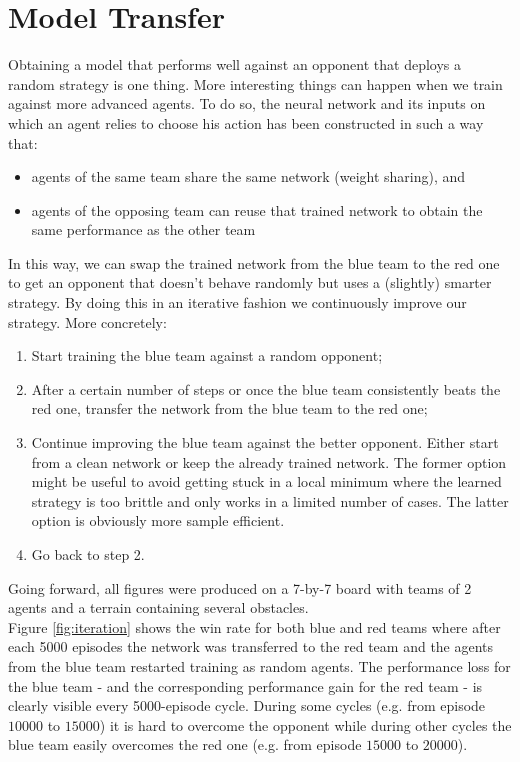 \section{Model Transfer}
\label{sec:model_transfer}
Obtaining a model that performs well against an opponent that deploys a random strategy is one thing. More interesting things can happen when we train against more advanced agents. To do so, the neural network and its inputs on which an agent relies to choose his action has been constructed in such a way that:
\begin{itemize}
    \item agents of the same team share the same network (weight sharing), and
    \item agents of the opposing team can reuse that trained network to obtain the same performance as the other team
\end{itemize}
In this way, we can swap the trained network from the blue team to the red one to get an opponent that doesn't behave randomly but uses a (slightly) smarter strategy. By doing this in an iterative fashion we continuously improve our strategy. More concretely:
\begin{enumerate}
    \item Start training the blue team against a random opponent;
    \item After a certain number of steps or once the blue team consistently beats the red one, transfer the network from the blue team to the red one;
    \item Continue improving the blue team against the better opponent. Either start from a clean network or keep the already trained network. The former option might be useful to avoid getting stuck in a local minimum where the learned strategy is too brittle and only works in a limited number of cases. The latter option is obviously more sample efficient.
    \item Go back to step 2.
\end{enumerate}
Going forward, all figures were produced on a 7-by-7 board with teams of 2 agents and a terrain containing several obstacles.\\
Figure \ref{fig:iteration} shows the win rate for both blue and red teams where after each 5000 episodes the network was transferred to the red team and the agents from the blue team restarted training as random agents. The performance loss for the blue team - and the corresponding performance gain for the red team - is clearly visible every 5000-episode cycle. During some cycles (e.g. from episode $10000$ to $15000$) it is hard to overcome the opponent while during other cycles the blue team easily overcomes the red one (e.g. from episode $15000$ to $20000$).\\
